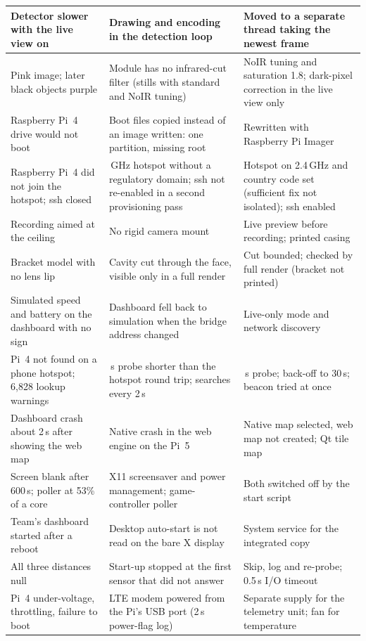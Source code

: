 \begin{longtable}{|>{\raggedright\arraybackslash}p{3.6cm}|>{\raggedright\arraybackslash}p{5.0cm}|>{\raggedright\arraybackslash}p{4.9cm}|}
Detector slower with the live view on & Drawing and encoding in the detection loop & Moved to a separate thread taking the newest frame \\ \hline
Pink image; later black objects purple & Module has no infrared-cut filter (stills with standard and NoIR tuning) & NoIR tuning and saturation 1.8; dark-pixel correction in the live view only \\ \hline
Raspberry Pi~4 drive would not boot & Boot files copied instead of an image written: one partition, missing root & Rewritten with Raspberry Pi Imager \\ \hline
Raspberry Pi~4 did not join the hotspot; ssh closed & 5\,GHz hotspot without a regulatory domain; ssh not re-enabled in a second provisioning pass & Hotspot on 2.4\,GHz and country code set (sufficient fix not isolated); ssh enabled \\ \hline
Recording aimed at the ceiling & No rigid camera mount & Live preview before recording; printed casing \\ \hline
Bracket model with no lens lip & Cavity cut through the face, visible only in a full render & Cut bounded; checked by full render (bracket not printed) \\ \hline
Simulated speed and battery on the dashboard with no sign & Dashboard fell back to simulation when the bridge address changed & Live-only mode and network discovery \\ \hline
Pi~4 not found on a phone hotspot; 6,828 lookup warnings & 1\,s probe shorter than the hotspot round trip; searches every 2\,s & 3\,s probe; back-off to 30\,s; beacon tried at once \\ \hline
Dashboard crash about 2\,s after showing the web map & Native crash in the web engine on the Pi~5 & Native map selected, web map not created; Qt tile map \\ \hline
Screen blank after 600\,s; poller at 53\% of a core & X11 screensaver and power management; game-controller poller & Both switched off by the start script \\ \hline
Team's dashboard started after a reboot & Desktop auto-start is not read on the bare X display & System service for the integrated copy \\ \hline
All three distances null & Start-up stopped at the first sensor that did not answer & Skip, log and re-probe; 0.5\,s I/O timeout \\ \hline
Pi~4 under-voltage, throttling, failure to boot & LTE modem powered from the Pi's USB port (2\,s power-flag log) & Separate supply for the telemetry unit; fan for temperature \\ \hline

\end{longtable}
